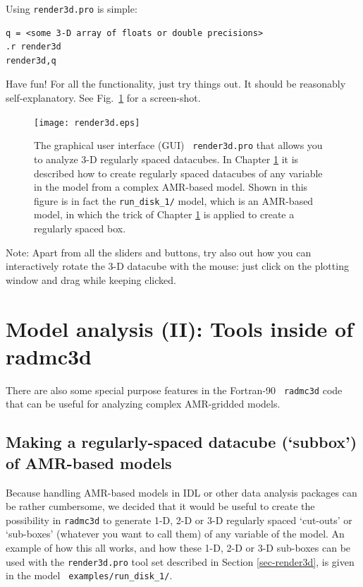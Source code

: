 \documentclass{report}
\newenvironment{asciibox}%
  {\begin{list}{}{%
    \setlength{\topsep}{0.5em}%
    \setlength{\parskip}{0em}%
    \setlength{\parsep}{0em}%
    \setlength{\itemsep}{0em}%
    \setlength{\rightmargin}{0em}%
    \setlength{\leftmargin}{3.0em}%
    \setlength{\labelsep}{1em}%
    \setlength{\labelwidth}{2em}%
  }\normalfont\footnotesize\item}
  {\end{list}}
\begin{document}
Using {\small\tt render3d.pro} is simple:
\begin{asciibox}\begin{verbatim}
q = <some 3-D array of floats or double precisions>
.r render3d
render3d,q
\end{verbatim}\end{asciibox}
Have fun! For all the functionality, just try things out. It should be
reasonably self-explanatory. See Fig.~\ref{fig-render3d} for a screen-shot.
%
\begin{figure}
\centerline{\texttt{[image: render3d.eps]}}
\caption{\label{fig-render3d} The graphical user interface (GUI) {\small\tt
    render3d.pro} that allows you to analyze 3-D regularly spaced
  datacubes. In Chapter \ref{chap-radmc3d-internal-analysis-tools} it is
  described how to create regularly spaced datacubes of any variable in the
  model from a complex AMR-based model. Shown in this figure is in fact
  the {\small\tt run\_disk\_1/} model, which is an AMR-based model, in which
  the trick of Chapter \ref{chap-radmc3d-internal-analysis-tools} is applied
  to create a regularly spaced box.}
\end{figure}
Note: Apart from all the sliders and buttons, try also out how you can
interactively rotate the 3-D datacube with the mouse: just click on the
plotting window and drag while keeping clicked.



\chapter{Model analysis (II): Tools inside of radmc3d}
\label{chap-radmc3d-internal-analysis-tools}
There are also some special purpose features in the Fortran-90 {\small\tt
  radmc3d} code that can be useful for analyzing complex AMR-gridded models.

\section{Making a regularly-spaced datacube (`subbox') of AMR-based models}
\label{sec-subbox}
Because handling AMR-based models in IDL or other data analysis packages can
be rather cumbersome, we decided that it would be useful to create the
possibility in {\small\tt radmc3d} to generate 1-D, 2-D or 3-D regularly
spaced `cut-outs' or `sub-boxes' (whatever you want to call them) of any
variable of the model. An example of how this all works, and how these 1-D,
2-D or 3-D sub-boxes can be used with the {\small\tt render3d.pro} tool set
described in Section \ref{sec-render3d}, is given in the model {\small\tt
  examples/run\_disk\_1/}.
\end{document}
